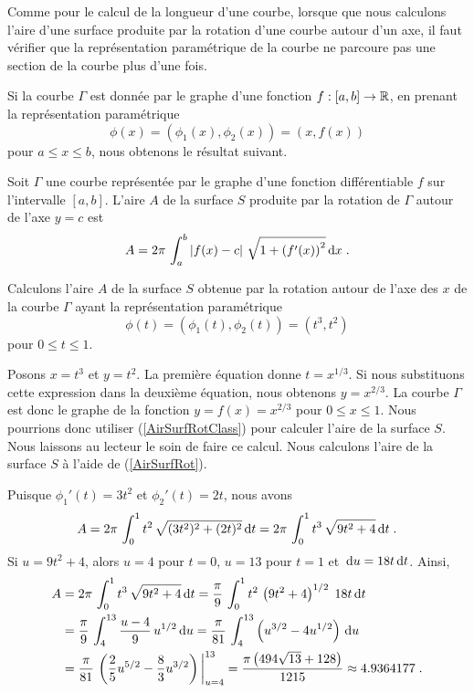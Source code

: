 {\begin{rmk}
Comme pour le calcul de la longueur d'une courbe, lorsque que nous
calculons l'aire d'une surface produite par la rotation d'une courbe
autour d'un axe, il faut vérifier que la représentation paramétrique
de la courbe ne parcoure pas une section de la courbe plus d'une
fois.
\end{rmk}

Si la courbe $\Gamma$ est donnée par le graphe d'une fonction
$f:[a,b]\rightarrow \mathbb{R}$, en prenant la représentation paramétrique
\[
\phi(x) = \left( \phi_1(x) , \phi_2(x) \right)
= \left( x , f(x) \right)
\]
pour $a \leq x \leq b$, nous obtenons le résultat suivant.

\begin{focus}{\prp}
Soit $\Gamma$ une courbe représentée par le graphe d'une fonction
différentiable $f$ sur l'intervalle $[a,b]$.  L'aire $A$ de la surface
$S$ produite par la rotation de $\Gamma$ autour de l'axe $y=c$ est
\begin{equation} \label{AirSurfRotClass}
A = 2\pi\, \int_a^b \left| f(x)-c \right| \, 
\sqrt{1 + \left( f'(x) \right)^2} \,\mathrm{d}x \; .
\end{equation}
\end{focus}

\begin{egg}
Calculons l'aire $A$ de la surface $S$ obtenue par la rotation autour
de l'axe des $x$ de la courbe $\Gamma$ ayant la représentation
paramétrique
\[
\phi(t) = \left( \phi_1(t) , \phi_2(t) \right)
= \left( t^3 , t^2 \right)
\]
pour $0 \leq t \leq 1$.

Posons $x=t^3$ et $y=t^2$.  La première équation donne $t= x^{1/3}$.
Si nous substituons cette expression dans la deuxième équation, nous
obtenons $y = x^{2/3}$.   La courbe $\Gamma$ est donc le graphe de
la fonction $y = f(x) = x^{2/3}$ pour $0\leq x \leq 1$.  Nous pourrions
donc utiliser (\ref{AirSurfRotClass}) pour calculer l'aire de la
surface $S$.  Nous laissons au lecteur le soin de faire ce calcul.
Nous calculons l'aire de la surface $S$ à l'aide de
(\ref{AirSurfRot}).

Puisque $\phi_1'(t) = 3t^2$ et $\phi_2'(t) = 2t$, nous avons
\[
A = 2\pi \,\int_0^1 t^2 \, \sqrt{(3t^2)^2 + (2t)^2} \,\mathrm{d}t
= 2\pi \,\int_0^1 t^3 \, \sqrt{9t^2 + 4} \,\mathrm{d}t \; .
\]
Si $u=9 t^2 +4$, alors $u=4$ pour $t=0$, $u=13$ pour $t=1$ et
$\displaystyle \,\mathrm{d}u = 18 t \,\mathrm{d}t$.  Ainsi,
\begin{align*}
A &= 2\pi \,\int_0^1 t^3 \, \sqrt{9t^2 + 4} \,\mathrm{d}t
= \frac{\pi}{9} \, \int_0^1 t^2 \, \left(9t^2 + 4\right)^{1/2} \;
18 t \,\mathrm{d}t \\
&= \frac{\pi}{9} \, \int_4^{13} \frac{u-4}{9} \, u^{1/2} \,\mathrm{d}u
= \frac{\pi}{81} \, \int_4^{13} \left(u^{3/2}-4u^{1/2}\right) \,\mathrm{d}u \\
&= \frac{\pi}{81} \,\left( \frac{2}{5} u^{5/2}- \frac{8}{3} u^{3/2}
\right)\bigg|_{u=4}^{13}
= \frac{\pi\left(494\sqrt{13} + 128\right)}{1215}
\approx 4.9364177 \; .
\end{align*}
\end{egg}

}
